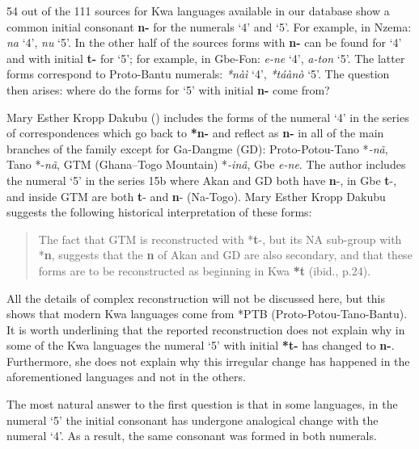 54 out of the 111 sources for Kwa languages available in our database show a common initial consonant \textbf{n-} for the numerals ‘4’ and ‘5’. For example, in Nzema: \textit{na} ‘4’, \textit{nu} ‘5’. In the other half of the sources forms with \textbf{n-} can be found for ‘4’ and with initial \textbf{t-} for ‘5’; for example, in Gbe-Fon: \textit{e-ne} ‘4’, \textit{a-ton} ‘5’. The latter forms correspond to Proto-Bantu numerals:  \textit{*nàì} ‘4’, \textit{*táànò} ‘5’. The question then arises: where do the forms for ‘5’ with initial \textbf{n-} come from? 

Mary Esther Kropp Dakubu (\citealt{KroppDakubu2012}) includes the forms of the numeral ‘4’ in the series of correspondences which go back to \textbf{*n-}   and reflect as \textbf{n-} in all of the main branches of the family except for Ga-Dangme (GD): Proto-Potou-Tano *\textit{-n{\~{a}}}, Tano *-\textit{n{\~{a}}}, GTM (Ghana–Togo Mountain) *\textit{-in{\^{a}}}, Gbe \textit{e-ne}. The author includes the numeral ‘5’ in the series 15b where Akan and GD both have \textbf{n}-, in Gbe \textbf{t}-, and inside GTM are both \textbf{t}- and \textbf{n}- (Na-Togo). Mary Esther Kropp Dakubu suggests the following historical interpretation of these forms: 

\begin{quote}
The fact that GTM is reconstructed with *\textbf{t}-, but its NA sub-group with *\textbf{n}, suggests that the \textbf{n} of Akan and GD are also secondary, and that these forms are to be reconstructed as beginning in Kwa \textbf{*t} (ibid., p.24). 
\end{quote}


All the details of complex reconstruction will not be discussed here, but this shows that modern Kwa languages come from *PTB (Proto-Potou-Tano-Bantu). It is worth underlining that the reported reconstruction does not explain why in some of the Kwa languages the numeral ‘5’ with initial \textbf{*t-} has changed to \textbf{n-}. Furthermore, she does not explain why this irregular change has happened in the aforementioned languages and not in the others. 

The most natural answer to the first question is that in some languages, in the numeral ‘5’ the initial consonant has undergone analogical change with the numeral ‘4’. As a result, the same consonant was formed in both numerals. 

